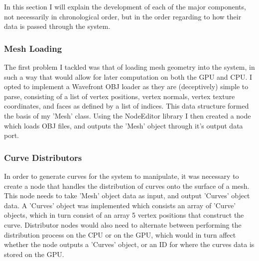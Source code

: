 \documentclass[]{acmsiggraph}
\begin{document}
In this section I will explain the development of each of the major components, not necessarily in chronological order, but in the order regarding to how their data is passed through the system.



\subsubsection{Mesh Loading} \label{sec:objLoading}

The first problem I tackled was that of loading mesh geometry into the system, in such a way that would allow for later computation on both the GPU and CPU. I opted to implement a Wavefront OBJ loader as they are (deceptively) simple to parse, consisting of a list of vertex positions, vertex normals, vertex texture coordinates, and faces as defined by a list of indices. This data structure formed the basis of my 'Mesh' class. Using the NodeEditor library I then created a node which loads OBJ files, and outputs the 'Mesh' object through it's output data port.

\subsubsection{Curve Distributors} \label{sec:distributors}

In order to generate curves for the system to manipulate, it was necessary to create a node that handles the distribution of curves onto the surface of a mesh. This node needs to take 'Mesh' object data as input, and output 'Curves' object data. A 'Curves' object was implemented which consists an array of 'Curve' objects, which in turn consist of an array 5 vertex positions that construct the curve. Distributor nodes would also need to alternate between performing the distribution process on the CPU or on the GPU, which would in turn affect whether the node outputs a 'Curves' object, or an ID for where the curves data is stored on the GPU.
\end{document}
